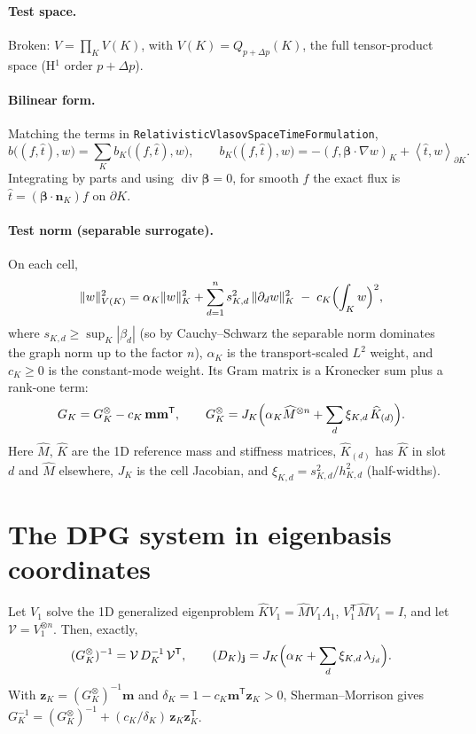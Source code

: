 \documentclass[11pt]{article}
\theoremstyle{remark}
\theoremstyle{definition}
\newcommand{\bbeta}{\boldsymbol{\beta}}
\newcommand{\bn}{\boldsymbol{n}}
\newcommand{\that}{\hat{t}}
\newcommand{\T}{\mathsf{T}}
\newcommand{\ip}[2]{\left(#1,#2\right)}
\newcommand{\dual}[2]{\left\langle #1,#2\right\rangle}
\DeclareMathOperator{\divz}{div}
\begin{document}
\paragraph{Test space.}  Broken: $V=\prod_K V(K)$, with $V(K)=Q_{p+\Delta p}(K)$, the full tensor-product space
(H$^1$ order $p+\Delta p$).

\paragraph{Bilinear form.}  Matching the terms in \texttt{RelativisticVlasovSpaceTimeFormulation},
\[
  b\bigl((f,\that),w\bigr) = \sum_K b_K\bigl((f,\that),w\bigr),\qquad
  b_K\bigl((f,\that),w\bigr) = -\ip{f}{\bbeta\cdot\nabla w}_K + \dual{\that}{w}_{\partial K}.
\]
Integrating by parts and using $\divz\bbeta=0$, for smooth $f$ the exact flux is $\that = (\bbeta\cdot\bn_K) f$ on
$\partial K$.

\paragraph{Test norm (separable surrogate).}  On each cell,
\[
  \|w\|_{V(K)}^2 = \alpha_K\|w\|_K^2 + \sum_{d=1}^n s_{K,d}^2\,\|\partial_d w\|_K^2 \;-\; c_K\Bigl(\int_K w\Bigr)^2,
\]
where $s_{K,d}\ge\sup_K|\beta_d|$ (so by Cauchy--Schwarz the separable norm dominates the graph norm up to the factor
$n$), $\alpha_K$ is the transport-scaled $L^2$ weight, and $c_K\ge0$ is the constant-mode weight.  Its Gram matrix
is a Kronecker sum plus a rank-one term:
\[
  G_K = G_K^{\otimes} - c_K\, \mathbf{m}\mathbf{m}^\T,\qquad
  G_K^{\otimes} = J_K\Bigl(\alpha_K \widehat M^{\otimes n} + \sum_d \xi_{K,d}\,\widehat K_{(d)}\Bigr).
\]
Here $\widehat M$, $\widehat K$ are the 1D reference mass and stiffness matrices, $\widehat K_{(d)}$ has $\widehat K$ in
slot $d$ and $\widehat M$ elsewhere, $J_K$ is the cell Jacobian, and $\xi_{K,d}=s_{K,d}^2/h_{K,d}^2$ (half-widths).

\section{The DPG system in eigenbasis coordinates}

Let $V_1$ solve the 1D generalized eigenproblem $\widehat K V_1 = \widehat M V_1\Lambda_1$, $V_1^\T\widehat M V_1=I$,
and let $\mathcal V = V_1^{\otimes n}$.  Then, exactly,
\[
  (G_K^{\otimes})^{-1} = \mathcal V\, D_K^{-1}\,\mathcal V^\T,\qquad
  (D_K)_{\mathbf j} = J_K\Bigl(\alpha_K + \sum_d \xi_{K,d}\,\lambda_{j_d}\Bigr).
\]
With $\mathbf z_K = (G_K^\otimes)^{-1}\mathbf m$ and $\delta_K = 1-c_K\mathbf m^\T\mathbf z_K>0$, Sherman--Morrison
gives $G_K^{-1} = (G_K^\otimes)^{-1} + (c_K/\delta_K)\,\mathbf z_K\mathbf z_K^\T$.
\end{document}
